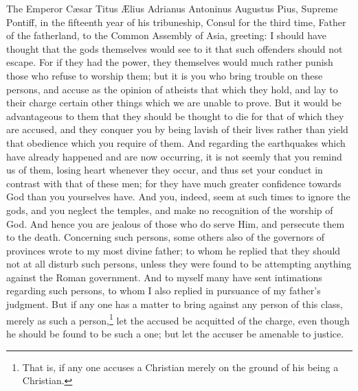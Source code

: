 The Emperor Cæsar Titus Ælius Adrianus Antoninus Augustus Pius, Supreme Pontiff, in the fifteenth year of his tribuneship, Consul for the third time, Father of the fatherland, to the Common Assembly of Asia, greeting: I should have thought that the gods themselves would see to it that such offenders should not escape. For if they had the power, they themselves would much rather punish those who refuse to worship them; but it is you who bring trouble on these persons, and accuse as the opinion of atheists that which they hold, and lay to their charge certain other things which we are unable to prove. But it would be advantageous to them that they should be thought to die for that of which they are accused, and they conquer you by being lavish of their lives rather than yield that obedience which you require of them. And regarding the earthquakes which have already happened and are now occurring, it is not seemly that you remind us of them, losing heart whenever they occur, and thus set your conduct in contrast with that of these men; for they have much greater confidence towards God than you yourselves have. And you, indeed, seem at such times to ignore the gods, and you neglect the temples, and make  no recognition of the worship of God. And hence you are jealous of those who do serve Him, and persecute them to the death. Concerning such persons, some others also of the governors of provinces wrote to my most divine father; to whom he replied that they should not at all disturb such persons, unless they were found to be attempting anything against the Roman government. And to myself many have sent intimations regarding such persons, to whom I also replied in pursuance of my father’s judgment. But if any one has a matter to bring against any person of this class, merely as such a person,\footnote{That is, if any one accuses a Christian merely on the ground of his being a Christian.} let the accused be acquitted of the charge, even though he should be found to be such a one; but let the accuser be amenable to justice.


